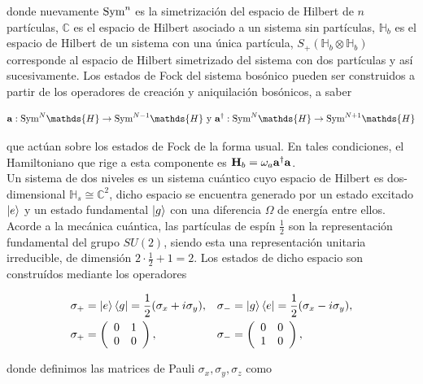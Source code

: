 \documentclass{report} %
\numberwithin{equation}{section}
\begin{document}
donde nuevamente $\textnormal{Sym}^{n}$ es la simetrización del espacio de Hilbert de $n$ partículas, $\mathds{C}$ es el espacio de Hilbert asociado a un sistema sin partículas, $\mathds{H}_b$ es el espacio de Hilbert de un sistema con una única partícula, $S_{+}(\mathds{H}_b \otimes \mathds{H}_b)$ corresponde al espacio de Hilbert simetrizado del sistema con dos partículas y así sucesivamente. Los estados de Fock del sistema bosónico pueden ser construidos a partir de los operadores de creación y aniquilación bosónicos, a saber

$$
{\bf a}:\textnormal{Sym}^{N} \mathds{H} \rightarrow \textnormal{Sym}^{N-1} \mathds{H} \textnormal{ y }{\bf a}^{\dagger}: \textnormal{Sym}^{N}\mathds{H} \rightarrow \textnormal{Sym}^{N+1}\mathds{H}$$

que actúan sobre los estados de Fock de la forma usual.
En tales condiciones, el Hamiltoniano que rige a esta componente es ${\bf H}_b = \omega_a {\bf a}^{\dagger}{\bf a}$. \\

Un sistema de dos niveles es un sistema cuántico cuyo espacio de Hilbert es dos-dimensional $\mathds{H}_s \cong \mathds{C}^2$, dicho espacio se encuentra generado por un estado excitado $\ket{e}$ y un estado fundamental $\ket{g}$ con una diferencia $\Omega$ de energía entre ellos. Acorde a la mecánica cuántica, las partículas de espín $\frac{1}{2}$ son la representación fundamental del grupo $SU(2)$, siendo esta una representación unitaria irreducible, de dimensión $2\cdot \frac{1}{2} +1 =2$. Los estados de dicho espacio son construídos mediante los operadores 

\begin{align}
    \sigma_+ &= \ket{e}\bra{g} = \frac{1}{2} (\sigma_x + i\sigma_y),  & \sigma_- &= \ket{g}\bra{e} = \frac{1}{2} (\sigma_x - i\sigma_y), \\
    \sigma_+ & = \left( \begin{array}{cc}
       0 & 1 \\
       0 & 0
    \end{array} \right),  & \sigma_- & = \left( \begin{array}{cc}
       0 & 0 \\
       1 & 0
    \end{array} \right),
\end{align}

donde definimos las matrices de Pauli $\sigma_x, \sigma_y, \sigma_z$ como
\end{document}
